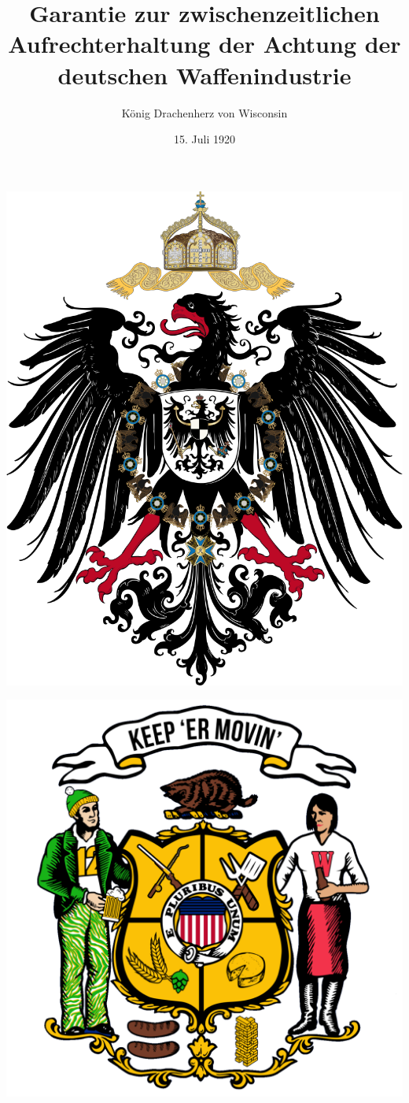 \documentclass{article}
\title{Garantie zur zwischenzeitlichen Aufrechterhaltung der Achtung der deutschen Waffenindustrie}
\author{König Drachenherz von Wisconsin}
\date{15. Juli 1920}
\begin{document}
\maketitle
\begin{center}
    \begin{minipage}{0.45\textwidth}
        \centering
        \includegraphics[scale=.15]{dr_wappen}
    \end{minipage}
    \hfill
    \begin{minipage}{0.45\textwidth}
        \centering
        \includegraphics[scale=.10]{wi_wappen.png}

\end{minipage}
\end{center}
\end{document}
